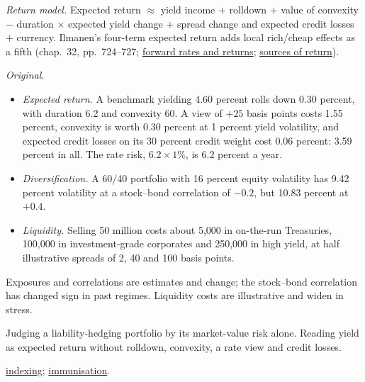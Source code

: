 \begin{qfdefinition}
\emph{Return model.} Expected return $\approx$ yield income $+$ rolldown $+$ value of convexity $-$ duration $\times$ expected yield change $+$ spread change and expected credit losses $+$ currency. Ilmanen's four-term expected return adds local rich/cheap effects as a fifth (chap.~32, pp.~724--727; \hyperref[meth:forward-rates-expected-returns]{forward rates and returns}; \hyperref[meth:bond-return-decomposition]{sources of return}).

 \emph{Original.}
\begin{itemize}
\item \emph{Expected return.} A benchmark yielding 4.60 percent rolls down 0.30 percent, with duration 6.2 and convexity 60. A view of $+25$ basis points costs 1.55 percent, convexity is worth 0.30 percent at 1 percent yield volatility, and expected credit losses on its 30 percent credit weight cost 0.06 percent: 3.59 percent in all. The rate risk, $6.2\times1\%$, is 6.2 percent a year.
\item \emph{Diversification.} A 60/40 portfolio with 16 percent equity volatility has 9.42 percent volatility at a stock--bond correlation of $-0.2$, but 10.83 percent at $+0.4$.
\item \emph{Liquidity.} Selling 50 million costs about 5{,}000 in on-the-run Treasuries, 100{,}000 in investment-grade corporates and 250{,}000 in high yield, at half illustrative spreads of 2, 40 and 100 basis points.
\end{itemize}

 Exposures and correlations are estimates and change; the stock--bond correlation has changed sign in past regimes. Liquidity costs are illustrative and widen in stress.

 Judging a liability-hedging portfolio by its market-value risk alone. Reading yield as expected return without rolldown, convexity, a rate view and credit losses.

 \hyperref[meth:bond-index-exposure-benchmarks]{indexing}; \hyperref[meth:immunisation-liabilities]{immunisation}.

\end{qfdefinition}

